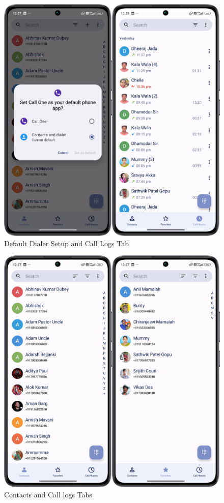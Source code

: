 \begin{figure}
    \centering
    \includegraphics[width=1\linewidth]{Media//whatsapp/dd}
    \caption{Default Dialer Setup and Call Logs Tab}
    \label{fig:Default Dialer Setup and Call Logs Tab}
\end{figure}

\begin{figure}
    \centering
    \includegraphics[width=1\linewidth]{Media//whatsapp/contactsand}
    \caption{Contacts and Call logs Tabs}
    \label{fig:Contacts and Call logs Tabs}
\end{figure}

